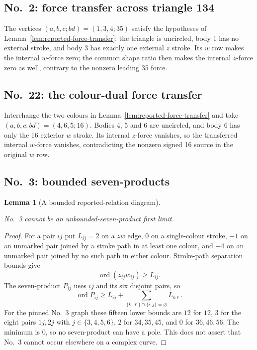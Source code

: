\documentclass[11pt]{amsart}
\newtheorem{lemma}[theorem]{Lemma}
\theoremstyle{remark}
\newcommand{\ord}{\operatorname{ord}}
\begin{document}
\subsection{No.~2: force transfer across triangle 134}
The vertices $(a,b,c;bd)=(1,3,4;35)$ satisfy the hypotheses of Lemma~\ref{lem:reported-force-transfer}: the triangle is uncircled, body 1 has no external stroke, and body 3 has exactly one external $z$ stroke. Its $w$ row makes the internal $w$-force zero; the common shape ratio then makes the internal $z$-force zero as well, contrary to the nonzero leading 35 force.
\subsection{No.~22: the colour-dual force transfer}
Interchange the two colours in Lemma~\ref{lem:reported-force-transfer} and take $(a,b,c;bd)=(4,6,5;16)$. Bodies 4, 5 and 6 are uncircled, and body 6 has only the 16 exterior $w$ stroke. Its internal $z$-force vanishes, so the transferred internal $w$-force vanishes, contradicting the nonzero signed 16 source in the original $w$ row.

\subsection{No.~3: bounded seven-products}
\begin{lemma}[A bounded reported-relation diagram]
\label{lem:reported-no3}

No.~3 cannot be an unbounded-seven-product first limit.
\end{lemma}

\begin{proof}For a pair $ij$ put $L_{ij}=2$ on a $zw$ edge, $0$ on a single-colour stroke, $-1$ on an unmarked pair joined by a stroke path in at least one colour, and $-4$ on an unmarked pair joined by no such path in either colour. Stroke-path separation bounds give
\[
\ord(z_{ij}w_{ij})\ge L_{ij}.
\]
The seven-product $P_{ij}$ uses $ij$ and its six disjoint pairs, so
\begin{equation}\label{eq:no3-product-bound}
\ord P_{ij}\ge L_{ij}+\sum_{\{k,\ell\}\cap\{i,j\}=\varnothing}L_{k\ell}.
\end{equation}
For the pinned No.~3 graph these fifteen lower bounds are $12$ for $12$, $3$ for the eight pairs $1j,2j$ with $j\in\{3,4,5,6\}$, $2$ for $34,35,45$, and $0$ for $36,46,56$. The minimum is $0$, so no seven-product can have a pole. This does not assert that No.~3 cannot occur elsewhere on a complex curve.
\end{proof}
\end{document}
